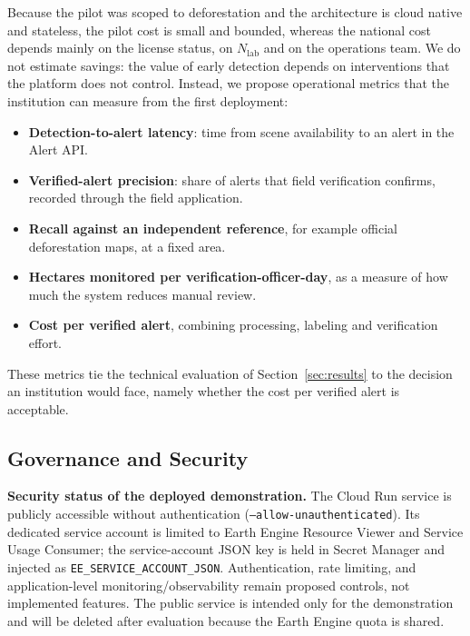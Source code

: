 \documentclass{article}
\begin{document}
Because the pilot was scoped to deforestation and the architecture is cloud
native and stateless, the pilot cost is small and bounded, whereas the national
cost depends mainly on the license status, on $N_{\text{lab}}$ and on the operations team. We do not
estimate savings: the value of early detection depends on interventions that the
platform does not control.
Instead, we propose operational metrics that the institution can measure from
the first deployment:
\begin{itemize}
    \item \textbf{Detection-to-alert latency}: time from scene availability to an alert in the Alert API.
    \item \textbf{Verified-alert precision}: share of alerts that field verification confirms, recorded through the field application.
    \item \textbf{Recall against an independent reference}, for example official deforestation maps, at a fixed area.
    \item \textbf{Hectares monitored per verification-officer-day}, as a measure of how much the system reduces manual review.
    \item \textbf{Cost per verified alert}, combining processing, labeling and verification effort.
\end{itemize}
These metrics tie the technical evaluation of Section~\ref{sec:results} to the
decision an institution would face, namely whether the cost per verified alert
is acceptable.

\subsection{Governance and Security}
\label{sec:governance}

\textbf{Security status of the deployed demonstration.} The Cloud Run service is publicly accessible without authentication (\texttt{--allow-unauthenticated}). Its dedicated service account is limited to Earth Engine Resource Viewer and Service Usage Consumer; the service-account JSON key is held in Secret Manager and injected as \texttt{EE\_SERVICE\_ACCOUNT\_JSON}. Authentication, rate limiting, and application-level monitoring/observability remain proposed controls, not implemented features. The public service is intended only for the demonstration and will be deleted after evaluation because the Earth Engine quota is shared.
\end{document}
